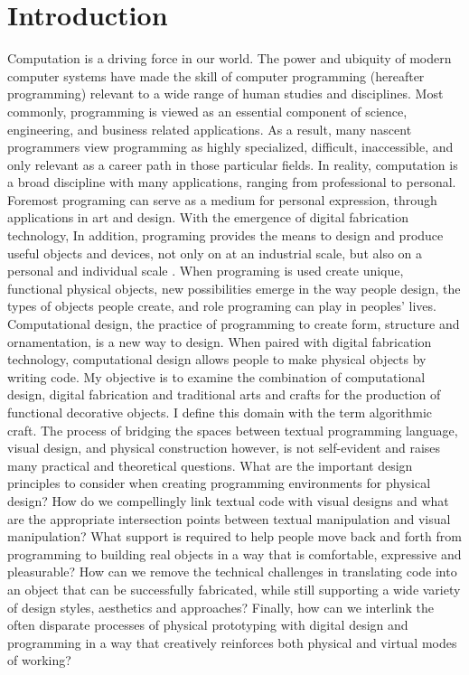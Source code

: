 \chapter{Introduction}

Computation is a driving force in our world. The power and ubiquity of  modern computer systems have made the skill of computer programming (hereafter programming) relevant to a wide range of human studies and disciplines. Most commonly, programming is viewed as an essential component of science, engineering, and business related applications\cite{resnick1}. As a result, many nascent programmers view programming as highly specialized, difficult, inaccessible, and only relevant as a career path in those particular fields. In reality, computation is a broad discipline with many applications, ranging from professional to personal. Foremost programing can serve as a medium for personal expression, through applications in art and design. With the emergence of digital fabrication technology, In addition, programing provides the means to design and produce useful objects and devices, not only on at an industrial scale, but also on a personal and individual scale \cite{mellis_thesis}. When programing is used create unique, functional physical objects, new possibilities emerge in the way people design,  the types of objects people create, and role programing can play in peoples' lives.  Computational design, the practice of programming to create form, structure and ornamentation, is a new way to design. When paired with digital fabrication technology, computational design allows people to make physical objects by writing code. My objective is to examine the combination of computational design, digital fabrication and traditional arts and crafts for the production of functional decorative objects. I define this domain with the term algorithmic craft. The process of bridging the spaces between textual programming language, visual design, and physical construction however, is not self-evident and raises many practical and theoretical questions.  What are the important design principles to consider when creating  programming environments for physical design? How do we compellingly link textual code with visual designs and what are the appropriate intersection points between textual manipulation and visual manipulation? What support is required to help people move back and forth from programming to building real objects in a way that is comfortable, expressive and pleasurable? How can we remove the technical challenges in translating code into an object that can be successfully fabricated, while still supporting a wide variety of design styles, aesthetics and approaches? Finally, how can we interlink the often disparate processes of physical prototyping with digital design and programming in a way that creatively reinforces both physical and virtual modes of working?

